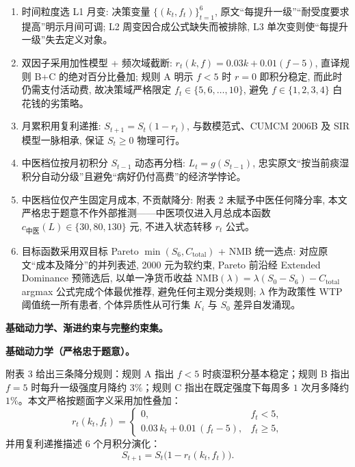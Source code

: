 \documentclass{MathorCupmodeling}
\providecommand{\tightlist}{%
  \setlength{\itemsep}{0pt}\setlength{\parskip}{0pt}}
\begin{document}
\begin{enumerate}
\def\labelenumi{(\arabic{enumi})}
\tightlist
\item 时间粒度选 L1 月变: 决策变量 $\{(k_t, f_t)\}_{t=1}^{6}$, 原文``每提升一级''``耐受度要求提高''明示月间可调; L2 周变因合成公式缺失而被排除, L3 单次变则使``每提升一级''失去定义对象。
\item 双因子采用加性模型 + 频次域截断: $r_t(k,f) = 0.03 k + 0.01(f-5)$, 直译规则 B+C 的绝对百分比叠加; 规则 A 明示 $f<5$ 时 $r=0$ 即积分稳定, 而此时仍需支付活动费, 故决策域严格限定 $f_t\in\{5,6,\dots,10\}$, 避免 $f\in\{1,2,3,4\}$ 白花钱的劣策略。
\item 月累积用复利递推: $S_{t+1}=S_t(1-r_t)$, 与数模范式、CUMCM 2006B 及 SIR 模型一脉相承, 保证 $S_t \ge 0$ 物理可行。
\item 中医档位按月初积分 $S_{t-1}$ 动态再分档: $L_t=g(S_{t-1})$, 忠实原文``按当前痰湿积分自动分级''且避免``病好仍付高费''的经济学悖论。
\item 中医档位仅产生固定月成本, 不贡献降分: 附表 2 未赋予中医任何降分率, 本文严格忠于题意不作外部推测——中医项仅进入月总成本函数 $c_{\text{中医}}(L)\in\{30,80,130\}$ 元, 不进入状态转移 $r_t$ 公式。
\item 目标函数采用双目标 Pareto $\min(S_6, C_{\text{total}})$ + NMB 统一选点: 对应原文``成本及降分''的并列表述, 2000 元为软约束, Pareto 前沿经 Extended Dominance 预筛选后, 以单一净货币收益 $\mathrm{NMB}(\lambda)=\lambda(S_0-S_6)-C_{\text{total}}$ argmax 公式完成个体最优推荐, 避免任何主观分类规则; $\lambda$ 作为政策性 WTP 阈值统一所有患者, 个体异质性从可行集 $K_i$ 与 $S_0$ 差异自发涌现。
\end{enumerate}

\noindent\textbf{基础动力学、渐进约束与完整约束集。}

\noindent\textbf{基础动力学（严格忠于题意）。}

附表 3 给出三条降分规则：规则 A 指出 $f<5$ 时痰湿积分基本稳定；规则 B 指出 $f=5$ 时每升一级强度月降约 $3\%$；规则 C 指出在既定强度下每周多 $1$ 次月多降约 $1\%$。本文严格按题面字义采用加性叠加：
\begin{equation}\label{eq:q3-r}
r_t(k_t,f_t) =
\begin{cases}
0, & f_t < 5, \\
0.03\,k_t + 0.01\,(f_t - 5), & f_t \ge 5,
\end{cases}
\end{equation}
并用复利递推描述 $6$ 个月积分演化：
\begin{equation}\label{eq:q3-S}
S_{t+1} = S_t\bigl(1 - r_t(k_t,f_t)\bigr).
\end{equation}
\end{document}
